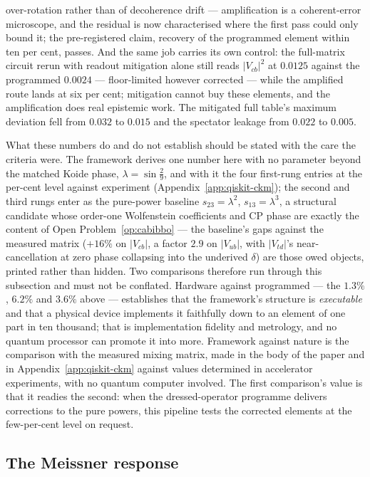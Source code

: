 over-rotation rather than of decoherence drift --- amplification is a coherent-error microscope,
and the residual is now characterised where the first pass could only bound it; the pre-registered
claim, recovery of the programmed element within ten per cent, passes. And the same job carries
its own control: the full-matrix circuit rerun with readout mitigation alone still reads
$|V_{cb}|^{2}$ at $0.0125$ against the programmed $0.0024$ --- floor-limited however corrected ---
while the amplified route lands at six per cent; mitigation cannot buy these elements, and the
amplification does real epistemic work. The mitigated full table's maximum deviation fell from
$0.032$ to $0.015$ and the spectator leakage from $0.022$ to $0.005$.

What these numbers do and do not establish should be stated with the care the criteria were. The
framework derives one number here with no parameter beyond the matched Koide phase, $\lambda =
\sin\tfrac29$, and with it the four first-rung entries at the per-cent level against experiment
(Appendix~\ref{app:qiskit-ckm}); the second and third rungs enter as the pure-power baseline
$s_{23} = \lambda^{2}$, $s_{13} = \lambda^{3}$, a structural candidate whose order-one
Wolfenstein coefficients and CP phase are exactly the content of Open Problem~\ref{op:cabibbo}
--- the baseline's gaps against the measured matrix ($+16\%$ on $|V_{cb}|$, a factor $2.9$ on
$|V_{ub}|$, with $|V_{td}|$'s near-cancellation at zero phase collapsing into the underived
$\delta$) are those owed objects, printed rather than hidden. Two comparisons therefore run
through this subsection and must not be conflated. Hardware against programmed --- the $1.3\%$,
$6.2\%$ and $3.6\%$ above --- establishes that the framework's structure is \emph{executable}
and that a physical device implements it faithfully down to an element of one part in ten
thousand; that is implementation fidelity and metrology, and no quantum processor can promote it
into more. Framework against nature is the comparison with the measured mixing matrix, made in
the body of the paper and in Appendix~\ref{app:qiskit-ckm} against values determined in
accelerator experiments, with no quantum computer involved. The first comparison's value is that
it readies the second: when the dressed-operator programme delivers corrections to the pure
powers, this pipeline tests the corrected elements at the few-per-cent level on request.

\subsection{The Meissner response}
\label{app:hw-meissner}

